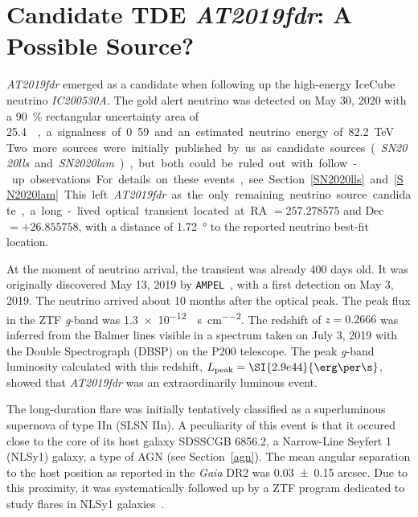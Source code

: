 \chapter{Candidate TDE \emph{AT2019fdr}: A Possible Source?}\label{at2019fdr}
\emph{AT2019fdr} emerged as a candidate when following up the high-energy IceCube neutrino \emph{IC200530A}. The gold alert neutrino was detected on May 30, 2020 with a \SI{90}{\percent} rectangular uncertainty area of \SI{25.4}{\square\deg}, a signalness of 0.59 and an estimated neutrino energy of \SI{82.2}{\tera\eV}~\cite{IC200530A1}.

Two more sources were initially published by us as candidate sources (\textit{SN2020lls} and \textit{SN2020lam}), but both could be ruled out with follow-up observations. For details on these events, see Section~\ref{SN2020lls} and~\ref{SN2020lam}. This left \emph{AT2019fdr} as the only remaining neutrino source candidate, a long-lived optical transient located at RA $= 257.278575$ and Dec $= +26.855758$, with a distance of \SI{1.72}{\degree} to the reported neutrino best-fit location.

At the moment of neutrino arrival, the transient was already 400 days old. It was originally discovered May 13, 2019 by \texttt{AMPEL}~, with a first detection on May 3, 2019. The neutrino arrived about 10 months after the optical peak. The peak flux in the ZTF \textit{g}-band was \SI{1.3e-12}{\erg\per\s\per\square\cm}. The redshift of $z=0.2666$ was inferred from the Balmer lines visible in a spectrum taken on July 3, 2019 with the Double Spectrograph (DBSP) on the P200 telescope. The peak \textit{g}-band luminosity calculated with this redshift, $L_\text{peak}=\SI{2.9e44}{\erg\per\s}$, showed that \emph{AT2019fdr} was an extraordinarily luminous event.

The long-duration flare was initially tentatively classified as a superluminous supernova of type IIn (SLSN IIn). A peculiarity of this event is that it occured close to the core of its host galaxy SDSSCGB 6856.2, a Narrow-Line Seyfert 1 (NLSy1) galaxy, a type of AGN (see Section~\ref{agn}). The mean angular separation to the host position as reported in the \textit{Gaia} DR2 was \num{0.03 \pm0.15} arcsec. Due to this proximity, it was systematically followed up by a ZTF program dedicated to study flares in NLSy1 galaxies~.

